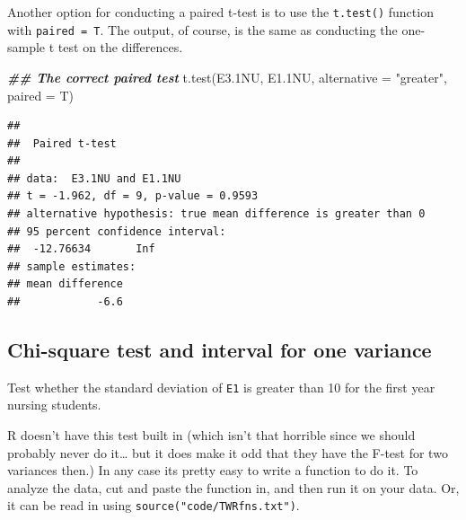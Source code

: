 \documentclass[
]{book}
\newenvironment{Shaded}{\begin{snugshade}}{\end{snugshade}}
\newcommand{\AttributeTok}[1]{\textcolor[rgb]{0.77,0.63,0.00}{#1}}
\newcommand{\DocumentationTok}[1]{\textcolor[rgb]{0.56,0.35,0.01}{\textbf{\textit{#1}}}}
\newcommand{\FloatTok}[1]{\textcolor[rgb]{0.00,0.00,0.81}{#1}}
\newcommand{\FunctionTok}[1]{\textcolor[rgb]{0.00,0.00,0.00}{#1}}
\newcommand{\NormalTok}[1]{#1}
\newcommand{\StringTok}[1]{\textcolor[rgb]{0.31,0.60,0.02}{#1}}
\begin{document}
Another option for conducting a paired t-test is to use the \texttt{t.test()} function with \texttt{paired\ =\ T}. The output, of course, is the same as conducting the one-sample t test on the differences.

\begin{Shaded}
\begin{Highlighting}[]
\DocumentationTok{\#\# The correct paired test}
\FunctionTok{t.test}\NormalTok{(E3}\FloatTok{.1}\NormalTok{NU, E1}\FloatTok{.1}\NormalTok{NU, }\AttributeTok{alternative =} \StringTok{"greater"}\NormalTok{, }\AttributeTok{paired =}\NormalTok{ T)}
\end{Highlighting}
\end{Shaded}

\begin{verbatim}
## 
##  Paired t-test
## 
## data:  E3.1NU and E1.1NU
## t = -1.962, df = 9, p-value = 0.9593
## alternative hypothesis: true mean difference is greater than 0
## 95 percent confidence interval:
##  -12.76634       Inf
## sample estimates:
## mean difference 
##            -6.6
\end{verbatim}

\hypertarget{chi-square-test-and-interval-for-one-variance}{%
\subsection{Chi-square test and interval for one variance}\label{chi-square-test-and-interval-for-one-variance}}

Test whether the standard deviation of \texttt{E1} is greater than 10 for the first year nursing students.

R doesn't have this test built in (which isn't that horrible since we should probably never do it\ldots{} but it does make it odd that they have the F-test for two variances then.) In any case its pretty easy to write a function to do it. To analyze the data, cut and paste the function in, and then run it on your data. Or, it can be read in using \texttt{source("code/TWRfns.txt")}.
\end{document}
